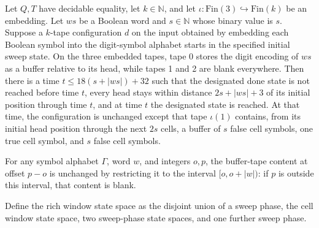 \begin{theorem}
\label{Turing.rt_cellWindow_ready_run}
\leanok
{}
Let $Q,T$ have decidable equality, let $k\in\mathbb{N}$, and let
$\iota:\mathrm{Fin}(3)\hookrightarrow\mathrm{Fin}(k)$ be an embedding. Let $ws$ be a
Boolean word and $s\in\mathbb{N}$ whose binary value is $s$. Suppose a $k$-tape
configuration $d$ on the input obtained by embedding each Boolean symbol into the
digit-symbol alphabet starts in the specified initial sweep state. On the three embedded
tapes, tape 0 stores the digit encoding of $ws$ as a buffer relative to its head, while
tapes 1 and 2 are blank everywhere. Then there is a time $t\le18(s+|ws|)+32$ such that
the designated done state is not reached before time $t$, every head stays within
distance $2s+|ws|+3$ of its initial position through time $t$, and at time $t$ the
designated state is reached. At that time, the configuration is unchanged except that
tape $\iota(1)$ contains, from its initial head position through the next $2s$ cells, a
buffer of $s$ false cell symbols, one true cell symbol, and $s$ false cell symbols.
\end{theorem}

\begin{theorem}
\label{Turing.rt_bufferMask}
\leanok
{}
For any symbol alphabet $\Gamma$, word $w$, and integers $o,p$, the buffer-tape content
at offset $p-o$ is unchanged by restricting it to the interval $[o,o+|w|)$: if $p$ is
outside this interval, that content is blank.
\end{theorem}

\begin{definition}
\label{Turing.rt_richWindowState}
\leanok
{}
Define the rich window state space as the disjoint union of a sweep phase, the cell
window state space, two sweep-phase state spaces, and one further sweep phase.
\end{definition}


